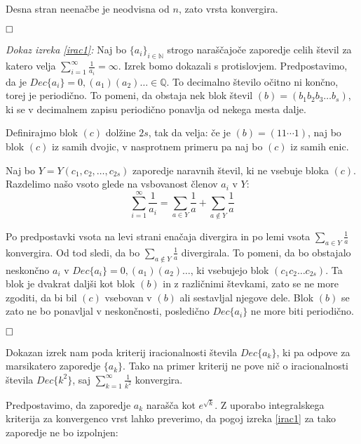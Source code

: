 \documentclass[a4paper,12pt]{article}
\def\N{\mathbb{N}} %
\def\Q{\mathbb{Q}} %
\def\qed{$\hfill\Box$}   %
\begin{document}
Desna stran neenačbe je neodvisna od $n$, zato vrsta konvergira.

\qed

\noindent
{\em Dokaz izreka \ref{irac1}:\/} Naj bo $\{a_i\}_{i\in \N}$ strogo naraščajoče zaporedje
celih števil za katero velja $\sum_{i=1}^{\infty}\frac{1}{a_i} = \infty$. Izrek bomo dokazali
s protislovjem. Predpostavimo, da je $Dec\{a_i\} = 0,(a_1)(a_2) \dots \in \Q$. To decimalno
število očitno ni končno, torej je periodično. 
To pomeni, da obstaja nek blok števil $(b) = (b_1b_2b_3 \dots b_s)$,
ki se v decimalnem zapisu periodično ponavlja od nekega mesta dalje. 

Definirajmo blok $(c)$ dolžine $2s$, tak da velja: če je $(b) = (11 \cdots 1)$, naj bo blok $(c)$
iz samih dvojic, v nasprotnem primeru pa naj bo $(c)$ iz samih enic.

Naj bo $Y = Y(c_1, c_2, \dots, c_{2s})$ zaporedje naravnih števil, ki ne vsebuje bloka $(c)$.
Razdelimo našo vsoto glede na vsbovanost členov $a_i$ v $Y$:
\[
    \sum_{i=1}^{\infty} \frac{1}{a_i} = \sum_{a \in Y}\frac{1}{a} + \sum_{a \notin Y} \frac{1}{a}
    \]

Po predpostavki vsota na levi strani enačaja divergira in po lemi vsota $\sum_{a \in Y}\frac{1}{a}$
konvergira. Od tod sledi, da bo $\sum_{a \notin Y} \frac{1}{a}$ divergirala.
To pomeni, da bo obstajalo neskončno $a_i$ v $Dec\{a_i\} = 0,(a_1)(a_2) \dots$, ki vsebujejo blok 
$(c_1c_2\dots c_{2s})$. Ta blok je dvakrat daljši kot blok $(b)$ in z različnimi števkami, zato se ne more
zgoditi, da bi bil $(c)$ vsebovan v $(b)$ ali sestavljal njegove dele. 
Blok $(b)$ se zato ne bo ponavljal v neskončnosti, posledično $Dec\{a_i\}$ ne more biti periodično.

\qed


Dokazan izrek nam poda kriterij iracionalnosti števila $Dec\{a_k\}$,
ki pa odpove za marsikatero zaporedje $\{a_k\}$.
Tako na primer kriterij ne pove nič o iracionalnosti števila $Dec\{k^2\}$, saj $\sum_{k=1}^{\infty}\frac{1}{k^2}$ konvergira.

Predpostavimo, da zaporedje $a_k$ narašča kot $e^{\sqrt{k}}$.
Z uporabo integralskega kriterija za konvergenco vrst lahko preverimo, da pogoj izreka \ref{irac1}
za tako zaporedje ne bo izpolnjen:
\end{document}
